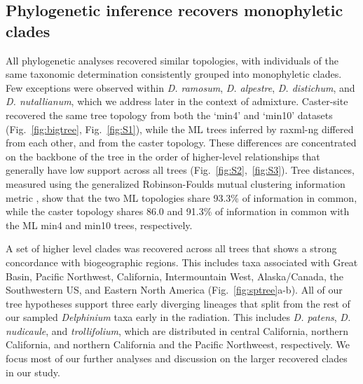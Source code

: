 \documentclass[11pt]{article}
\begin{document}
\subsection{Phylogenetic inference recovers monophyletic clades}
All phylogenetic analyses recovered similar topologies, with individuals of the same 
taxonomic determination consistently grouped into monophyletic clades. Few exceptions
were observed within \emph{D. ramosum}, \emph{D. alpestre}, \emph{D. distichum}, and 
\emph{D. nutallianum}, which we address later in the context of admixture.
% 
Caster-site recovered the same tree topology from both the `min4' and `min10' 
datasets (Fig.~\ref{fig:bigtree}, Fig.~\ref{fig:S1}), while the ML trees
inferred by raxml-ng differed from each other, and from the caster topology.
% 
These differences are concentrated on the backbone of the tree in the order 
of higher-level relationships that generally have low support across all trees 
(Fig.~\ref{fig:S2},~\ref{fig:S3}).
% 
Tree distances, measured using the generalized Robinson-Foulds mutual clustering
information metric \citep[MCI;][]{smith_information_2020}, show that the two
ML topologies share 93.3\% of information in common, while the caster topology
shares 86.0 and 91.3\% of information in common with the ML min4 and min10 
trees, respectively.


A set of higher level clades was recovered across all trees that shows a strong
concordance with biogeographic regions.
This includes taxa associated with Great Basin, Pacific Northwest, California, 
Intermountain West, Alaska/Canada, the Southwestern US, and Eastern North America
(Fig.~\ref{fig:sptree}a-b). 
% 
All of our tree hypotheses support three early diverging lineages that split
from the rest of our sampled \emph{Delphinium} taxa early in the radiation. 
This includes \emph{D. patens}, \emph{D. nudicaule}, and \emph{trollifolium},
which are distributed in central California, northern California, and northern 
California and the Pacific Northweest, respectively. We focus most of our further
analyses and discussion on the larger recovered clades in our study.
% 
\end{document}

